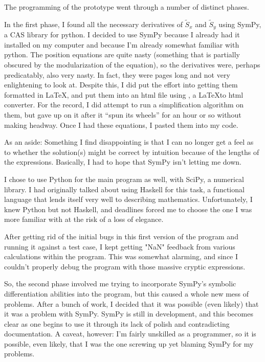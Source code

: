 \documentclass[12pt, letterpaper]{article}
\begin{document}
The programming of the prototype went through a number of distinct phases.

In the first phase, I found all the necessary derivatives of \(\tilde{S}_x\) and \(\tilde{S}_y\) using SymPy, a CAS library for python. I decided to use SymPy because I already had it installed on my computer and because I'm already somewhat familiar with python.  The position equations are quite nasty (something that is partially obscured by the modularization of the equation), so the derivatives were, perhaps predicatably, also very nasty. In fact, they were pages long and not very enlightening to look at. Despite this, I did put the effort into getting them formatted in \LaTeX, and put them into an html file using \hevea, a \LaTeX to html converter. For the record, I did attempt to run a simplification algorithm on them, but gave up on it after it ``spun its wheels'' for an hour or so without making headway. Once I had these equations, I pasted them into my code.

As an aside: Something I find disappointing is that I can no longer get a feel as to whether the solution(s) might be correct by intuition because of the lengths of the expressions. Basically, I had to hope that SymPy isn't letting me down.

I chose to use Python for the main program as well, with SciPy, a numerical library. I had originally talked about using Haskell for this task, a functional language that lends itself very well to describing mathematics. Unfortunately, I knew Python but not Haskell, and deadlines forced me to choose the one I was more familiar with at the risk of a loss of elegance.

After getting rid of the initial bugs in this first version of the program and running it against a test case, I kept getting "NaN" feedback from various calculations within the program. This was somewhat alarming, and since I couldn't properly debug the program with those massive cryptic expressions.

So, the second phase involved me trying to incorporate SymPy's symbolic differentiation abilities into the program, but this caused a whole new mess of problems.  After a bunch of work, I decided that it was possible (even likely) that it was a problem with SymPy. SymPy is still in development, and this becomes clear as one begins to use it through its lack of polish and contradicting documentation. A caveat, however: I'm fairly unskilled as a programmer, so it is possible, even likely, that I was the one screwing up yet blaming SymPy for my problems.
\end{document}
